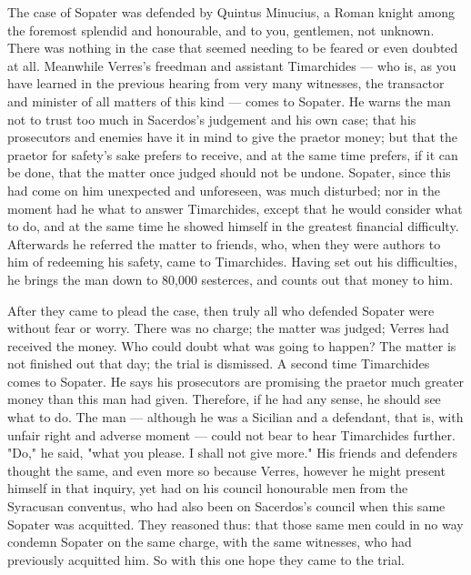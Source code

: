  The case of Sopater was defended by Quintus Minucius, a Roman knight among the foremost splendid and honourable, and to you, gentlemen, not unknown. There was nothing in the case that seemed needing to be feared or even doubted at all. Meanwhile Verres's freedman and assistant Timarchides --- who is, as you have learned in the previous hearing from very many witnesses, the transactor and minister of all matters of this kind --- comes to Sopater. He warns the man not to trust too much in Sacerdos's judgement and his own case; that his prosecutors and enemies have it in mind to give the praetor money; but that the praetor for safety's sake prefers to receive, and at the same time prefers, if it can be done, that the matter once judged should not be undone. Sopater, since this had come on him unexpected and unforeseen, was much disturbed; nor in the moment had he what to answer Timarchides, except that he would consider what to do, and at the same time he showed himself in the greatest financial difficulty. Afterwards he referred the matter to friends, who, when they were authors to him of redeeming his safety, came to Timarchides. Having set out his difficulties, he brings the man down to 80,000 sesterces, and counts out that money to him.

 After they came to plead the case, then truly all who defended Sopater were without fear or worry. There was no charge; the matter was judged; Verres had received the money. Who could doubt what was going to happen? The matter is not finished out that day; the trial is dismissed. A second time Timarchides comes to Sopater. He says his prosecutors are promising the praetor much greater money than this man had given. Therefore, if he had any sense, he should see what to do. The man --- although he was a Sicilian and a defendant, that is, with unfair right and adverse moment --- could not bear to hear Timarchides further. "Do," he said, "what you please. I shall not give more." His friends and defenders thought the same, and even more so because Verres, however he might present himself in that inquiry, yet had on his council honourable men from the Syracusan conventus, who had also been on Sacerdos's council when this same Sopater was acquitted. They reasoned thus: that those same men could in no way condemn Sopater on the same charge, with the same witnesses, who had previously acquitted him. So with this one hope they came to the trial.

